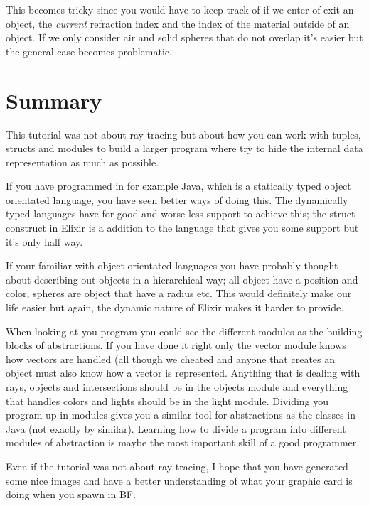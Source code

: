 \documentclass[a4paper,11pt]{article}
\begin{document}
This becomes tricky since you would have to keep track of if we enter
of exit an object, the {\em current} refraction index and the index of
the material outside of an object. If we only consider air and solid
spheres that do not overlap it's easier but the general case becomes
problematic.



\section{Summary}
This tutorial was not about ray tracing but about how you can work
with tuples, structs and modules to build a larger program where try
to hide the internal data representation as much as possible.

If you have programmed in for example Java, which is a statically typed
object orientated language, you have seen better ways of doing
this. The dynamically typed languages have for good and worse less
support to achieve this; the struct construct in Elixir is a addition
to the language that gives you some support but it's only half way.

If your familiar with object orientated languages you have probably
thought about describing out objects in a hierarchical way; all object
have a position and color, spheres are object that have a radius
etc. This would definitely make our life easier but again, the dynamic
nature of Elixir makes it harder to provide.

When looking at you program you could see the different modules as the
building blocks of abstractions. If you have done it right only the
vector module knows how vectors are handled (all though we cheated
and anyone that creates an object must also know how a vector is
represented. Anything that is dealing with rays, objects and
intersections should be in the objects module and everything that
handles colors and lights should be in the light module. Dividing you
program up in modules gives you a similar tool for abstractions as the
classes in Java (not exactly by similar). Learning how to divide a
program into different modules of abstraction is maybe the most
important skill of a good programmer.

Even if the tutorial was not about ray tracing, I hope that you have
generated some nice images and have a better understanding of what
your graphic card is doing when you spawn in BF.
\end{document}
